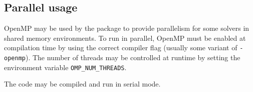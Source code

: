 
\subsection{Parallel usage}
OpenMP may be used by the {\tt \fullpackagename} package to provide
parallelism for some solvers in shared memory environments.
To run in parallel, OpenMP
must be enabled at compilation time by using the correct compiler flag
(usually some variant of {\tt -openmp}).
The number of threads may be controlled at runtime
by setting the environment variable {\tt OMP\_NUM\_THREADS}.

\noindent
The code may be compiled and run in serial mode.
